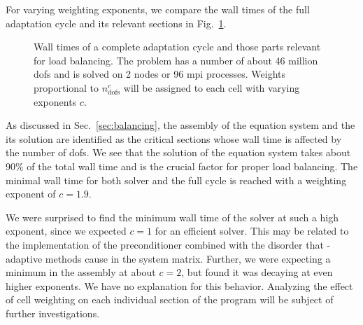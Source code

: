 For varying weighting exponents, we compare the wall times of the full adaptation cycle and its relevant sections
in Fig.~\ref{fig:weights}.

\begin{figure}
\centering

\caption[Wall times for load balancing with varying weighting exponents.]{Wall times of a complete adaptation cycle and those parts relevant for load balancing. The problem has a number of about 46 million \glspl{dof} and is solved on 2 nodes or 96 \gls{mpi} processes. Weights proportional to $n_\text{dofs}^c$ will be assigned to each cell with varying exponents $c$.}
\label{fig:weights}
\end{figure}

As discussed in Sec.~\ref{sec:balancing}, the assembly of the equation system and the its solution are identified as the critical sections whose wall time is affected by the number of \glspl{dof}. We see that the solution of the equation system takes about 90\% of the total wall time and is the crucial factor for proper load balancing. The minimal wall time for both solver and the full cycle is reached with a weighting exponent of $c = 1.9$.

We were surprised to find the minimum wall time of the solver at such a high exponent, since we expected $c = 1$ for an efficient solver. This may be related to the implementation of the preconditioner combined with the disorder that \hp-adaptive methods cause in the system matrix. Further, we were expecting a minimum in the assembly at about $c = 2$, but found it was decaying at even higher exponents. We have no explanation for this behavior. Analyzing the effect of cell weighting on each individual section of the program
will be subject of further investigations.

